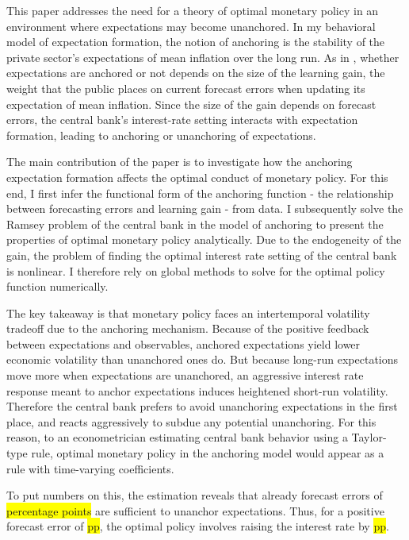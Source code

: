 \documentclass[11pt]{article}
\renewcommand{\[}{\begin{equation}}
\renewcommand{\]}{\end{equation}}
\begin{document}
This paper addresses the need for a theory of optimal monetary policy in an environment where expectations may become unanchored. In my behavioral model of expectation formation, the notion of anchoring is the stability of the private sector's expectations of mean inflation over the long run. As in \cite{carvalho2019anchored}, whether expectations are anchored or not depends on the size of the learning gain, the weight that the public places on current forecast errors when updating its expectation of mean inflation. Since the size of the gain depends on forecast errors, the central bank's interest-rate setting interacts with expectation formation, leading to anchoring or unanchoring of expectations.

The main contribution of the paper is to investigate how the anchoring expectation formation affects the optimal conduct of monetary policy. For this end, I first infer the functional form of the anchoring function - the relationship between forecasting errors and learning gain -  from data. I subsequently solve the Ramsey problem of the central bank in the model of anchoring to present the properties of optimal monetary policy analytically. Due to the endogeneity of the gain, the problem of finding the optimal interest rate setting of the central bank is nonlinear. I therefore rely on global methods to solve for the optimal policy function numerically.

The key takeaway is that monetary policy faces an intertemporal volatility tradeoff due to the anchoring mechanism. Because of the positive feedback between expectations and observables, anchored expectations yield lower economic volatility than unanchored ones do. But because long-run expectations move more when expectations are unanchored, an aggressive interest rate response meant to anchor expectations induces heightened short-run volatility. Therefore the central bank prefers to avoid unanchoring expectations in the first place, and reacts aggressively to subdue any potential unanchoring. For this reason, to an econometrician estimating central bank behavior using a Taylor-type rule, optimal monetary policy in the anchoring model would appear as a rule with time-varying coefficients. 

To put numbers on this, the estimation reveals that already forecast errors of \colorbox{yellow}{percentage points} are sufficient to unanchor expectations. Thus, for a positive forecast error of \colorbox{yellow}{pp}, the optimal policy involves raising the interest rate by \colorbox{yellow}{pp}.
\end{document}
